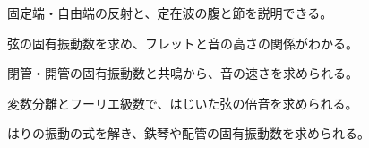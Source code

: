 \begin{furikaeri}
\begin{checklist}
\item 固定端・自由端の反射と、定在波の腹と節を説明できる。
\item 弦の固有振動数を求め、フレットと音の高さの関係がわかる。
\item 閉管・開管の固有振動数と共鳴から、音の速さを求められる。
\item 変数分離とフーリエ級数で、はじいた弦の倍音を求められる。
\item はりの振動の式を解き、鉄琴や配管の固有振動数を求められる。
\end{checklist}
\end{furikaeri}
